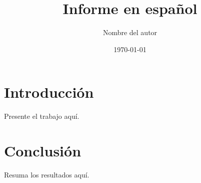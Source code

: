 \documentclass[12pt]{report}
\title{Informe en español}
\author{Nombre del autor}
\date{\today}
\begin{document}
\maketitle
\tableofcontents

\chapter{Introducción}
Presente el trabajo aquí.

\chapter{Conclusión}
Resuma los resultados aquí.

% 
\end{document}
